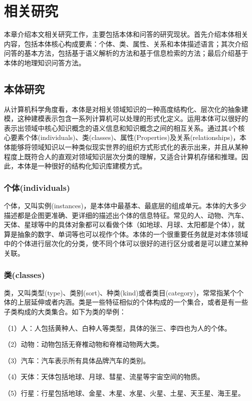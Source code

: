 \chapter{相关研究}
本章介绍本文相关研究工作，主要包括本体和问答的研究现状。首先介绍本体相关内容，包括本体核心构成要素：个体、类、属性、关系和本体描述语言；其次介绍问答的基本方法，包括基于语义解析的方法和基于信息检索的方法；最后介绍基于本体的地理知识问答方法。

\section{本体研究}
从计算机科学角度看，本体是对相关领域知识的一种高度结构化、层次化的抽象建模，这种建模表示包含一系列计算机可以处理的形式化定义\cite{Hitzler}。运用本体可以很好的表示出领域中核心知识概念的语义信息和知识概念之间的相互关系。通过其4个核心要素个体(individuals)、类(classes)、属性(Properties)及关系(relationships)，本体能够将领域知识以一种类似现实世界的组织方式形式化的表示出来，并且从某种程度上既符合人的直观对领域知识层次分类的理解，又适合计算机存储和推理。因此，本体是一种很好的结构化知识库建模方式。

\subsection{个体(individuals)}
个体，又叫实例(instances)，是本体中最基本、最底层的组成单元。本体的大多少描述都是企图更准确、更详细的描述出个体的信息特征。常见的人、动物、汽车、天体、星球等中的具体对象都可以看做个体（如地球、月球、太阳都是个体），就算是抽象的数字、单词等也可以视作个体。本体的一个很重要任务就是对本体领域中的个体进行层次化的分类，使不同个体可以很好的进行区分或者是可以建立某种关联。

\subsection{类(classes)}
类，又叫类型(type)、类别(sort)、种类(kind)或者类目(category)，常常指某个个体的上层延伸或者内涵。类是一些特征相似的个体构成的一个集合，或者是有一些子类构成的大类集合。如下为类的举例：

（1）人：人包括黄种人、白种人等类型，具体的张三、李四也为人的个体。

（2）动物：动物包括无脊椎动物和脊椎动物两大类。

（3）汽车：汽车表示所有具体品牌汽车的类别。

（4）天体：天体包括地球、月球、彗星、流星等宇宙空间的物质。

（5）行星：行星包括地球、金星、木星、水星、火星、土星、天王星、海王星。

